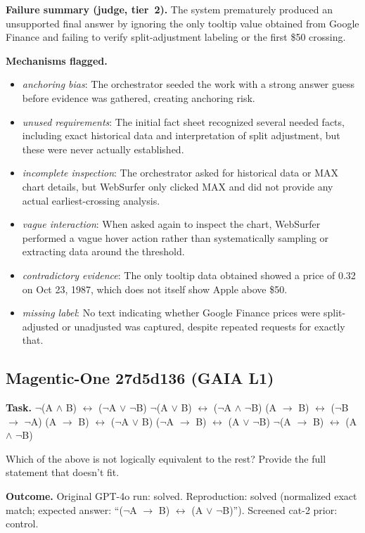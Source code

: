 \textbf{Failure summary (judge, tier~2).} The system prematurely produced an unsupported final answer by ignoring the only tooltip value obtained from Google Finance and failing to verify split-adjustment labeling or the first \$50 crossing.

\textbf{Mechanisms flagged.}
\begin{itemize}
  \item \emph{anchoring bias}: The orchestrator seeded the work with a strong answer guess before evidence was gathered, creating anchoring risk.
  \item \emph{unused requirements}: The initial fact sheet recognized several needed facts, including exact historical data and interpretation of split adjustment, but these were never actually established.
  \item \emph{incomplete inspection}: The orchestrator asked for historical data or MAX chart details, but WebSurfer only clicked MAX and did not provide any actual earliest-crossing analysis.
  \item \emph{vague interaction}: When asked again to inspect the chart, WebSurfer performed a vague hover action rather than systematically sampling or extracting data around the threshold.
  \item \emph{contradictory evidence}: The only tooltip data obtained showed a price of 0.32 on Oct 23, 1987, which does not itself show Apple above \$50.
  \item \emph{missing label}: No text indicating whether Google Finance prices were split-adjusted or unadjusted was captured, despite repeated requests for exactly that.
\end{itemize}

\subsection*{Magentic-One 27d5d136 (GAIA L1)}
\textbf{Task.} $\lnot$(A $\land$ B) $\leftrightarrow$ ($\lnot$A $\lor$ $\lnot$B)
$\lnot$(A $\lor$ B) $\leftrightarrow$ ($\lnot$A $\land$ $\lnot$B)
(A $\rightarrow$ B) $\leftrightarrow$ ($\lnot$B $\rightarrow$ $\lnot$A)
(A $\rightarrow$ B) $\leftrightarrow$ ($\lnot$A $\lor$ B)
($\lnot$A $\rightarrow$ B) $\leftrightarrow$ (A $\lor$ $\lnot$B)
$\lnot$(A $\rightarrow$ B) $\leftrightarrow$ (A $\land$ $\lnot$B)

Which of the above is not logically equivalent to the rest? Provide the full statement that doesn't fit.

\textbf{Outcome.} Original GPT-4o run: solved. Reproduction: solved (normalized exact match; expected answer: ``($\lnot$A $\rightarrow$ B) $\leftrightarrow$ (A $\lor$ $\lnot$B)''). Screened cat-2 prior: control.


